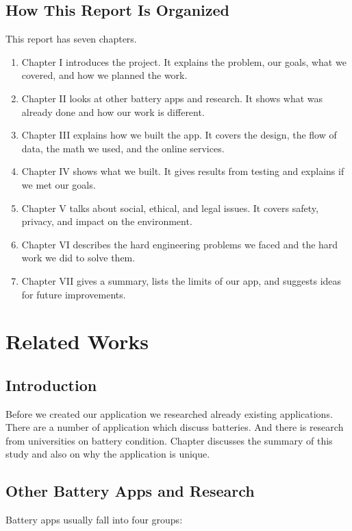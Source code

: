 \documentclass[12pt,a4paper]{report}
\begin{document}
\section{How This Report Is Organized}
This report has seven chapters.

\begin{enumerate}
    \item Chapter I introduces the project. It explains the problem, our goals, what we covered, and how we planned the work.
    \item Chapter II looks at other battery apps and research. It shows what was already done and how our work is different.
    \item Chapter III explains how we built the app. It covers the design, the flow of data, the math we used, and the online services.
    \item Chapter IV shows what we built. It gives results from testing and explains if we met our goals.
    \item Chapter V talks about social, ethical, and legal issues. It covers safety, privacy, and impact on the environment.
    \item Chapter VI describes the hard engineering problems we faced and the hard work we did to solve them.
    \item Chapter VII gives a summary, lists the limits of our app, and suggests ideas for future improvements.
\end{enumerate}


\chapter{Related Works}

\section{Introduction}
Before we created our application we researched already existing applications. There are a number of application which discuss batteries. And there is research from universities on battery condition. Chapter discusses the summary of this study and also on why the application is unique.

\section{Other Battery Apps and Research}
Battery apps usually fall into four groups:
\end{document}
